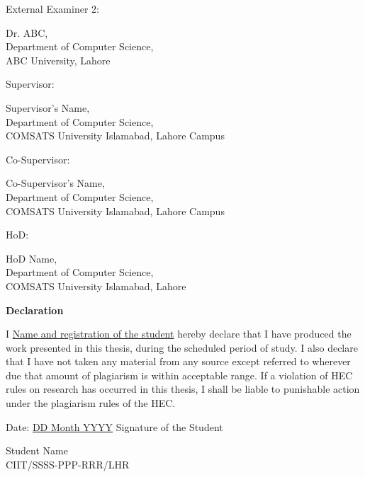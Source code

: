\begin{titlepage}
External Examiner 2: \hrulefill
\begin{center} 
	Dr. ABC,\\
	Department of Computer Science,\\
	ABC University, Lahore
\end{center}

Supervisor: \hrulefill
\begin{center} 
	Supervisor's Name,\\
	Department of Computer Science,\\
	COMSATS University Islamabad, Lahore Campus
\end{center}

Co-Supervisor: \hrulefill
\begin{center} 
	Co-Supervisor's Name,\\
	Department of Computer Science,\\
	COMSATS University Islamabad, Lahore Campus
\end{center}

HoD: \hrulefill
\begin{center} 
	HoD Name,\\
	Department of Computer Science,\\
	COMSATS University Islamabad, Lahore
\end{center}
\pagebreak


\begin{center}
\vspace{1cm }
\textbf{\large Declaration}\\
\end{center}
I \underline{Name and registration of the student} hereby declare that I have produced the
work presented in this thesis, during the scheduled period of study. I also declare that I
have not taken any material from any source except referred to wherever due that
amount of plagiarism is within acceptable range. If a violation of HEC rules on research
has occurred in this thesis, I shall be liable to punishable action under the plagiarism
rules of the HEC. \\


\vspace{7cm }
\begin{flushleft}
	Date: \underline{DD Month YYYY}  \hspace*{6.35cm} Signature of the Student
	\vspace{-1cm}
\end{flushleft}
\begin{flushright}
	Student Name \\
	CIIT/SSSS-PPP-RRR/LHR
\end{flushright}
\pagebreak



\end{titlepage}
